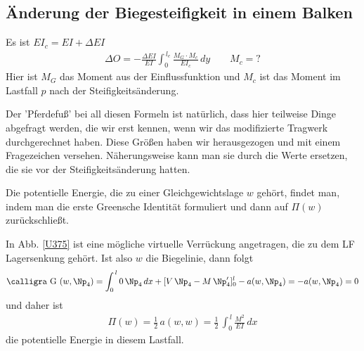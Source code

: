 {{{{{{%
\textcolor{blau2}{\subsection{\"{A}nderung der Biegesteifigkeit in einem Balken}}
Es ist $EI_c = EI + \Delta EI$
\begin{align}
\Delta O = - \frac{\Delta EI}{EI} \int_0^{\,l_e} \frac{M_G \cdot M_c}{EI_c}\,dy \qquad M_c = ?
\end{align}
Hier ist $M_G$ das Moment aus der Einflussfunktion und $M_c$ ist das Moment im Lastfall $p$ nach der Steifigkeits\"{a}nderung.

Der 'Pferdefu{\ss}' bei all diesen Formeln ist nat\"{u}rlich, dass hier teilweise Dinge abgefragt werden, die wir erst kennen, wenn wir das modifizierte Tragwerk durchgerechnet haben. Diese Gr\"{o}{\ss}en haben wir herausgezogen und mit einem Fragezeichen versehen. N\"{a}herungsweise kann man sie durch die Werte ersetzen, die sie vor der Steifigkeits\"{a}nderung hatten.



Die potentielle Energie, die zu einer Gleichgewichtslage $w$ geh\"{o}rt, findet man, indem man die erste Greensche Identit\"{a}t formuliert und dann auf $\Pi(w)$ zur\"{u}ckschlie{\ss}t.

In Abb. \ref{U375} ist eine m\"{o}gliche virtuelle Verr\"{u}ckung angetragen, die zu dem LF Lagersenkung geh\"{o}rt. Ist also $w$ die Biegelinie, dann folgt
\begin{align}
\text{\normalfont\calligra G\,\,}(w,\Np_4) = \int_0^{\,l} 0\,\Np_4\,dx + [V\,\Np_4 - M\,\Np_4']_0^l - a(w,\Np_4) = - a(w,\Np_4) = 0
\end{align}
und daher ist
\begin{align}
\Pi(w) = \frac{1}{2}\, a(w,w) = \frac{1}{2}\,\int_0^{\,l} \frac{M^2}{EI}\,dx
\end{align}
die potentielle Energie in diesem Lastfall.


}}}}}}
